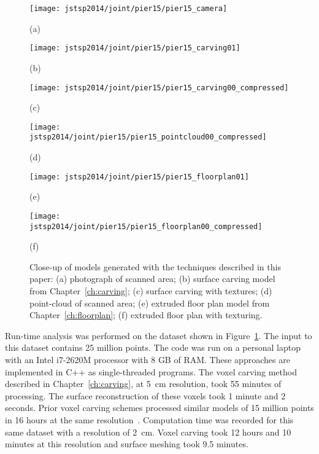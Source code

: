 \documentclass[12pt,onecolumn,oneside]{book}
\begin{document}
\begin{figure}[t]

	\begin{minipage}[t]{0.30\linewidth}
		\centerline{\texttt{[image: jstsp2014/joint/pier15/pier15\_camera]}}
		\centerline{(a)}\medskip
	\end{minipage}
	\hfill
	\begin{minipage}[t]{0.30\linewidth}
		\centerline{\texttt{[image: jstsp2014/joint/pier15/pier15\_carving01]}}
		\centerline{(b)}\medskip
	\end{minipage}
	\hfill
	\begin{minipage}[t]{0.30\linewidth}
		\centerline{\texttt{[image: jstsp2014/joint/pier15/pier15\_carving00\_compressed]}}
		\centerline{(c)}\medskip
	\end{minipage}
	
	\begin{minipage}[b]{0.30\linewidth}
		\centerline{\texttt{[image: jstsp2014/joint/pier15/pier15\_pointcloud00\_compressed]}}
		\centerline{(d)}\medskip
	\end{minipage}
	\hfill
	\begin{minipage}[b]{0.30\linewidth}
		\centerline{\texttt{[image: jstsp2014/joint/pier15/pier15\_floorplan01]}}
		\centerline{(e)}\medskip
	\end{minipage}
	\hfill
	\begin{minipage}[b]{0.30\linewidth}
		\centerline{\texttt{[image: jstsp2014/joint/pier15/pier15\_floorplan00\_compressed]}}
		\centerline{(f)}\medskip
	\end{minipage}
	
	\caption[Comparison of models of construction environment.]{Close-up of models generated with the techniques described in this paper:  (a) photograph of scanned area; (b) surface carving model from Chapter~\ref{ch:carving}; (c) surface carving with textures; (d) point-cloud of scanned area; (e) extruded floor plan model from Chapter~\ref{ch:floorplan}; (f) extruded floor plan with texturing.}
	\label{fig:compare_pier15}

\end{figure}


Run-time analysis was performed on the dataset shown in Figure~\ref{fig:compare_pier15}.  The input to this dataset contains 25 million points.  The code was run on a personal laptop with an Intel i7-2620M processor with 8 GB of RAM.  These approaches are implemented in C++ as single-threaded programs.  The voxel carving method described in Chapter~\ref{ch:carving}, at 5~cm resolution, took 55 minutes of processing.  The surface reconstruction of these voxels took 1 minute and 2 seconds.  Prior voxel carving schemes processed similar models of 15 million points in 16 hours at the same resolution~\cite{Carving}.  Computation time was recorded for this same dataset with a resolution of 2~cm.  Voxel carving took 12 hours and 10 minutes at this resolution and surface meshing took 9.5 minutes.
\end{document}
